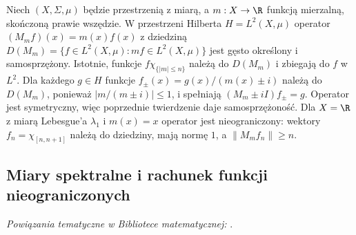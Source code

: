 \begin{przyklad}
\label{ex:mult-unbounded33}
Niech $(X,\Sigma,\mu)$ będzie przestrzenią z miarą, a
$m:X\to\R$ funkcją mierzalną, skończoną prawie wszędzie.
W przestrzeni Hilberta $H=L^2(X,\mu)$ operator
$(M_mf)(x)=m(x)f(x)$ z dziedziną
$D(M_m)=\{f\in L^2(X,\mu):mf\in L^2(X,\mu)\}$
jest gęsto określony i samosprzężony. Istotnie, funkcje
$f\chi_{\{|m|\le n\}}$ należą do $D(M_m)$ i zbiegają do $f$
w $L^2$. Dla każdego $g\in H$ funkcje
$f_\pm(x)=g(x)/(m(x)\pm i)$ należą do $D(M_m)$,
ponieważ $|m/(m\pm i)|\le1$, i spełniają
$(M_m\pm iI)f_\pm=g$. Operator jest symetryczny, więc
poprzednie twierdzenie daje samosprzężoność.
Dla $X=\R$ z miarą Lebesgue'a $\lambda_1$ i $m(x)=x$
operator jest nieograniczony: wektory $f_n=\chi_{[n,n+1]}$
należą do dziedziny, mają normę $1$, a $\|M_m f_n\|\ge n$.
\end{przyklad}

\subsection{Miary spektralne i rachunek funkcji nieograniczonych}

\noindent\emph{Powiązania tematyczne w Bibliotece matematycznej:} .


